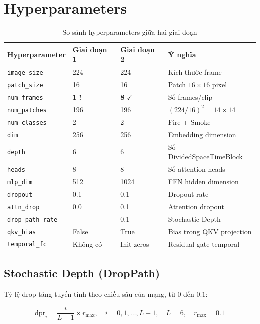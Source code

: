 \documentclass[12pt,a4paper]{article}
\begin{document}
\section{Hyperparameters}

\begin{table}[h!]
\centering
{}
\begin{tabular}{llll}
\toprule
\textbf{Hyperparameter} & \textbf{Giai đoạn 1} & \textbf{Giai đoạn 2} & \textbf{Ý nghĩa} \\
\midrule
\texttt{image\_size} & 224 & 224 & Kích thước frame \\
\texttt{patch\_size} & 16 & 16 & Patch $16\!\times\!16$ pixel \\
\texttt{num\_frames} & \textbf{1} \quad \textbf{!} & \textbf{8} \quad $\checkmark$ & Số frames/clip \\
\texttt{num\_patches} & 196 & 196 & $(224/16)^2 = 14\!\times\!14$ \\
\texttt{num\_classes} & 2 & 2 & Fire + Smoke \\
\texttt{dim} & 256 & 256 & Embedding dimension \\
\texttt{depth} & 6 & 6 & Số DividedSpaceTimeBlock \\
\texttt{heads} & 8 & 8 & Số attention heads \\
\texttt{mlp\_dim} & 512 & 1024 & FFN hidden dimension \\
\texttt{dropout} & 0.1 & 0.1 & Dropout rate \\
\texttt{attn\_drop} & 0.0 & 0.1 & Attention dropout \\
\texttt{drop\_path\_rate} & --- & 0.1 & Stochastic Depth \\
\texttt{qkv\_bias} & False & True & Bias trong QKV projection \\
\texttt{temporal\_fc} & Không có & Init zeros & Residual gate temporal \\
\bottomrule
\end{tabular}
\caption{So sánh hyperparameters giữa hai giai đoạn}
\end{table}

\subsection{Stochastic Depth (DropPath)}

Tỷ lệ drop tăng tuyến tính theo chiều sâu của mạng, từ $0$ đến $0.1$:

\[
\text{dpr}_i = \frac{i}{L-1} \times r_{\max}, \quad i=0,1,\ldots,L-1, \quad L=6, \quad r_{\max}=0.1
\]
\end{document}
